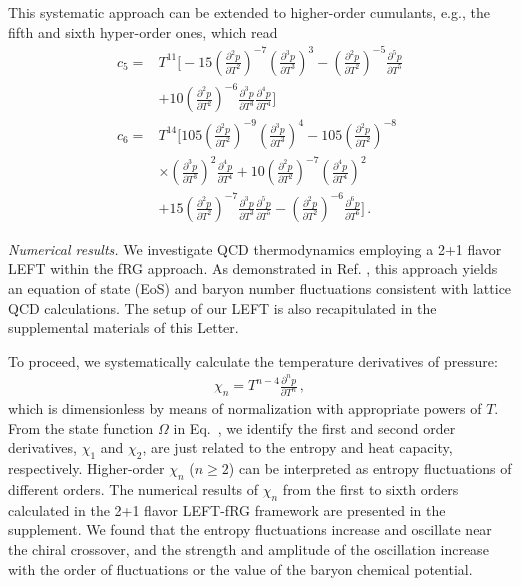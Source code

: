 \documentclass[aps,twocolumn,prd,superscriptaddress,nofootinbib,floatfix]{revtex4-2}
\begin{document}
This systematic approach can be extended to higher-order cumulants, e.g., the fifth and sixth hyper-order ones, which read
\begin{equation}\label{eq:c56}\begin{split}
    c_5=&T^{11}\Bigg[-15\left(\frac{\partial^2 p}{\partial T^2}\right)^{-7}\left(\frac{\partial^3 p}{\partial T^3}\right)^3-\left(\frac{\partial^2 p}{\partial T^2}\right)^{-5}\frac{\partial^5 p}{\partial T^5}\\[2ex]
    &+10\left(\frac{\partial^2 p}{\partial T^2}\right)^{-6}\frac{\partial^3 p}{\partial T^3}\frac{\partial^4 p}{\partial T^4}\Bigg]\,\\[2ex]
     c_6=&T^{14}\Bigg[105\left(\frac{\partial^2 p}{\partial T^2}\right)^{-9}\left(\frac{\partial^3 p}{\partial T^3}\right)^4-105\left(\frac{\partial^2 p}{\partial T^2}\right)^{-8}\\[2ex]
    &\times\left(\frac{\partial^3 p}{\partial T^3}\right)^2\frac{\partial^4 p}{\partial T^4}+10\left(\frac{\partial^2 p}{\partial T^2}\right)^{-7}\left(\frac{\partial^4 p}{\partial T^4}\right)^2\\[2ex]
    &+15\left(\frac{\partial^2 p}{\partial T^2}\right)^{-7}\frac{\partial^3 p}{\partial T^3}\frac{\partial^5 p}{\partial T^5}-\left(\frac{\partial^2 p}{\partial T^2}\right)^{-6}\frac{\partial^6 p}{\partial T^6}\Bigg]\,.
\end{split} 
\end{equation}


\textit{Numerical results.}\label{sec:numerical} We investigate QCD thermodynamics employing a 2+1 flavor LEFT within the fRG approach. As demonstrated in Ref. \cite{Wen:2018nkn}, this approach yields an equation of state (EoS) and baryon number fluctuations consistent with lattice QCD calculations. The setup of our LEFT is also recapitulated in the supplemental materials of this Letter.

To proceed, we systematically calculate the temperature derivatives of pressure: 
\begin{align}
    \chi_n=T^{n-4}\frac{\partial^n p}{\partial T^n}\,, \label{eq:chi}
\end{align}
which is dimensionless by means of normalization with appropriate powers of $T$. From the state function $\Omega$ in Eq.~, we identify the first and second order derivatives, $\chi_1$ and $\chi_2$, are just related to the entropy and heat capacity, respectively. Higher-order $\chi_n$ ($n \geq 2$) can be interpreted as entropy fluctuations of different orders. The numerical results of $\chi_n$ from the first to sixth orders calculated in the 2+1 flavor LEFT-fRG framework are presented in the supplement. We found that the entropy fluctuations increase and oscillate near the chiral crossover, and the strength and amplitude of the oscillation increase with the order of fluctuations or the value of the baryon chemical potential. 
\end{document}

